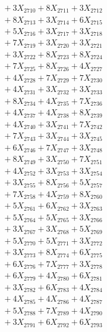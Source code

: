 \documentclass[a4paper,10pt]{article}
\begin{document}
{\begin{align}
&\;  + 3 X_{2710} + 8 X_{2711} + 3 X_{2712} \\[0.3ex]
&\;  + 8 X_{2713} + 3 X_{2714} + 6 X_{2715} \\[0.3ex]
&\;  + 5 X_{2716} + 3 X_{2717} + 3 X_{2718} \\[0.3ex]
&\;  + 7 X_{2719} + 3 X_{2720} + 3 X_{2721} \\[0.3ex]
&\;  + 3 X_{2722} + 8 X_{2723} + 8 X_{2724} \\[0.3ex]
&\;  + 7 X_{2725} + 8 X_{2726} + 4 X_{2727} \\[0.3ex]
&\;  + 4 X_{2728} + 7 X_{2729} + 7 X_{2730} \\[0.3ex]
&\;  + 4 X_{2731} + 3 X_{2732} + 3 X_{2733} \\[0.3ex]
&\;  + 8 X_{2734} + 4 X_{2735} + 7 X_{2736} \\[0.3ex]
&\;  + 4 X_{2737} + 4 X_{2738} + 8 X_{2739} \\[0.5ex]\allowbreak
&\;  + 4 X_{2740} + 3 X_{2741} + 7 X_{2742} \\[0.3ex]
&\;  + 7 X_{2743} + 3 X_{2744} + 3 X_{2745} \\[0.3ex]
&\;  + 6 X_{2746} + 7 X_{2747} + 3 X_{2748} \\[0.3ex]
&\;  + 8 X_{2749} + 3 X_{2750} + 7 X_{2751} \\[0.3ex]
&\;  + 4 X_{2752} + 3 X_{2753} + 3 X_{2754} \\[0.3ex]
&\;  + 3 X_{2755} + 8 X_{2756} + 5 X_{2757} \\[0.3ex]
&\;  + 7 X_{2758} + 4 X_{2759} + 8 X_{2760} \\[0.3ex]
&\;  + 5 X_{2761} + 6 X_{2762} + 3 X_{2763} \\[0.3ex]
&\;  + 5 X_{2764} + 5 X_{2765} + 3 X_{2766} \\[0.3ex]
&\;  + 3 X_{2767} + 3 X_{2768} + 5 X_{2769} \\[0.5ex]\allowbreak
&\;  + 5 X_{2770} + 5 X_{2771} + 3 X_{2772} \\[0.3ex]
&\;  + 3 X_{2773} + 8 X_{2774} + 6 X_{2775} \\[0.3ex]
&\;  + 6 X_{2776} + 7 X_{2777} + 3 X_{2778} \\[0.3ex]
&\;  + 6 X_{2779} + 4 X_{2780} + 6 X_{2781} \\[0.3ex]
&\;  + 3 X_{2782} + 6 X_{2783} + 4 X_{2784} \\[0.3ex]
&\;  + 4 X_{2785} + 4 X_{2786} + 4 X_{2787} \\[0.3ex]
&\;  + 5 X_{2788} + 7 X_{2789} + 4 X_{2790} \\[0.3ex]
&\;  + 3 X_{2791} + 6 X_{2792} + 6 X_{2793} \\[0.3ex]

\end{align}}
\end{document}
